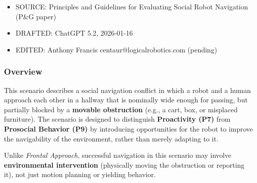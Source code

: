 \documentclass[utf8]{frontiers_suppmat} %
\providecommand{\tightlist}{%
  \setlength{\itemsep}{0pt}\setlength{\parskip}{0pt}}
\begin{document}
\begin{itemize}
\tightlist
\item
  SOURCE: Principles and Guidelines for Evaluating Social Robot
  Navigation (P\&G paper)
\item
  DRAFTED: ChatGPT 5.2, 2026-01-16
\item
  EDITED: Anthony Francis centaur@logicalrobotics.com (pending)
\end{itemize}

\subsubsection{Overview}\label{overview}

This scenario describes a social navigation conflict in which a robot
and a human approach each other in a hallway that is nominally wide
enough for passing, but partially blocked by a \textbf{movable
obstruction} (e.g., a cart, box, or misplaced furniture). The scenario
is designed to distinguish \textbf{Proactivity (P7)} from
\textbf{Prosocial Behavior (P9)} by introducing opportunities for the
robot to improve the navigability of the environment, rather than merely
adapting to it.

Unlike \emph{Frontal Approach}, successful navigation in this scenario
may involve \textbf{environmental intervention} (physically moving the
obstruction or reporting it), not just motion planning or yielding
behavior.
\end{document}
